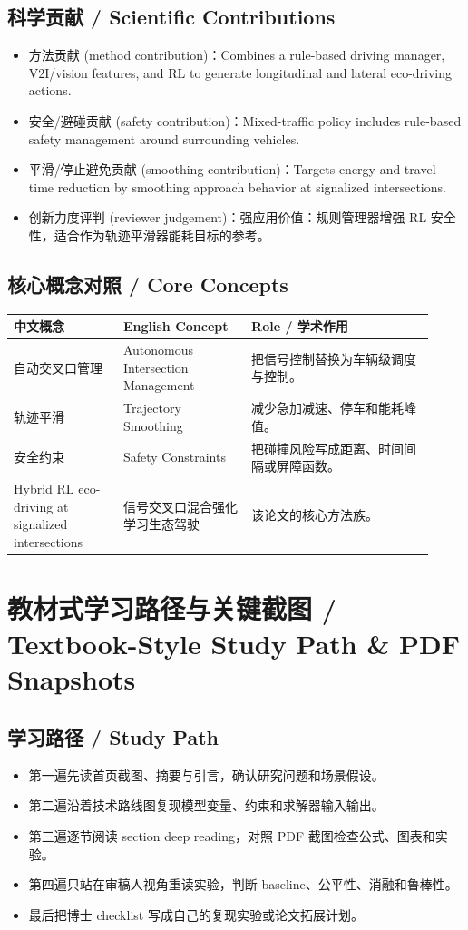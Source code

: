 \documentclass[UTF8,a4paper,11pt,fontset=fandol]{ctexart}
\begin{document}
\subsection{科学贡献 / Scientific Contributions}
\begin{itemize}
\item 方法贡献 (method contribution)：Combines a rule-based driving manager, V2I/vision features, and RL to generate longitudinal and lateral eco-driving actions.
\item 安全/避碰贡献 (safety contribution)：Mixed-traffic policy includes rule-based safety management around surrounding vehicles.
\item 平滑/停止避免贡献 (smoothing contribution)：Targets energy and travel-time reduction by smoothing approach behavior at signalized intersections.
\item 创新力度评判 (reviewer judgement)：强应用价值：规则管理器增强 RL 安全性，适合作为轨迹平滑器能耗目标的参考。
\end{itemize}


\subsection{核心概念对照 / Core Concepts}
\begin{longtable}{p{0.24\linewidth}p{0.28\linewidth}p{0.40\linewidth}}
\toprule
中文概念 & English Concept & Role / 学术作用\\
\midrule
自动交叉口管理 & Autonomous Intersection Management & 把信号控制替换为车辆级调度与控制。 \\
轨迹平滑 & Trajectory Smoothing & 减少急加减速、停车和能耗峰值。 \\
安全约束 & Safety Constraints & 把碰撞风险写成距离、时间间隔或屏障函数。 \\
Hybrid RL eco-driving at signalized intersections & 信号交叉口混合强化学习生态驾驶 & 该论文的核心方法族。 \\
\bottomrule
\end{longtable}

\section{教材式学习路径与关键截图 / Textbook-Style Study Path \& PDF Snapshots}
\subsection{学习路径 / Study Path}
\begin{itemize}
\item 第一遍先读首页截图、摘要与引言，确认研究问题和场景假设。
\item 第二遍沿着技术路线图复现模型变量、约束和求解器输入输出。
\item 第三遍逐节阅读 section deep reading，对照 PDF 截图检查公式、图表和实验。
\item 第四遍只站在审稿人视角重读实验，判断 baseline、公平性、消融和鲁棒性。
\item 最后把博士 checklist 写成自己的复现实验或论文拓展计划。
\end{itemize}
\end{document}
